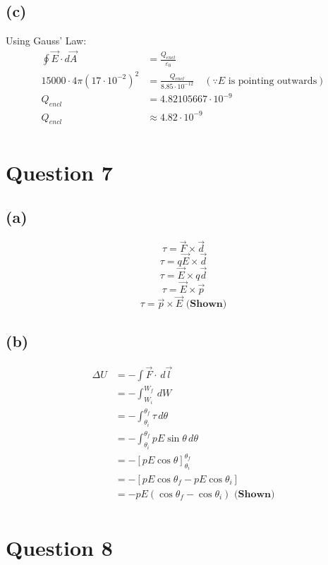 \documentclass[11pt]{article}
\begin{document}
\subsection{(c)}
\label{sec:orgd8ffcfb}
Using Gauss' Law:
\begin{align*}
\oint \vec{E} \cdot d \vec{A} &= \frac{Q_{encl}}{\varepsilon_0} \\
15000 \cdot 4 \pi (17 \cdot 10^{-2})^2 &= \frac{Q_{encl}}{8.85 \cdot 10^{-12}} \quad (\because E \text{ is pointing outwards}) \\
Q_{encl} &= 4.82105667 \cdot 10^{-9} \\
Q_{encl} &\approx 4.82 \cdot 10^{-9} \\
\end{align*}


\section{Question 7}
\label{sec:org0ce7da7}

\subsection{(a)}
\label{sec:org78294b6}
\[\tau = \vec{F} \times \vec{d}\]
\[\tau = q\vec{E} \times \vec{d}\]
\[\tau = \vec{E} \times q\vec{d}\]
\[\tau = \vec{E} \times \vec{p}\]
\[\tau = \vec{p} \times \vec{E} \textbf{ (Shown)}\]


\subsection{(b)}
\label{sec:orgde172ce}
\begin{align*}
\Delta U &= - \int \vec{F} \cdot \, d \vec{l} \\
&= - \int_{W_i}^{W_f} \, dW \\
&= - \int_{\theta_i}^{\theta_f} \tau \, d \theta \\
&= - \int_{\theta_i}^{\theta_f} pE \sin \theta \, d \theta \\
&= - [pE \cos \theta]_{\theta_i}^{\theta_f} \\
&= - [pE \cos \theta_f - pE \cos \theta_i ] \\
&= - pE(\cos \theta_f - \cos \theta_i) \textbf{ (Shown)} \\
\end{align*}


\section{Question 8}
\label{sec:org9e524b2}
\end{document}
